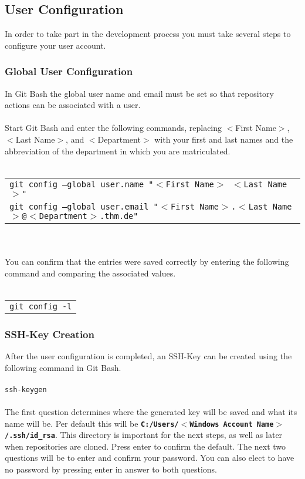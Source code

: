 \subsection{User Configuration}

In order to take part in the development process you must take several steps to configure your user account.

\subsubsection{Global User Configuration}
In Git Bash the global user name and email must be set so that repository actions can be associated with a user.\\
\\
Start Git Bash and enter the following commands, replacing $<$First Name$>$, $<$Last Name$>$, and $<$Department$>$ with your first and last names and the abbreviation of the department in which you are matriculated.\\
\\
\begin{tabular}{l}
	\texttt{git config --global user.name "$<$First Name$>$ $<$Last Name$>$"}\\
	\texttt{git config --global user.email "$<$First Name$>$.$<$Last Name$>$@$<$Department$>$.thm.de"}\\
\end{tabular}\\
\\
You can confirm that the entries were saved correctly by entering the following command and comparing the associated values.\\
\\
\begin{tabular}{l}
	\texttt{git config -l}
\end{tabular}

\subsubsection{SSH-Key Creation}

After the user configuration is completed, an SSH-Key can be created using the following command in Git Bash.\\
\\ 
\texttt{ssh-keygen}\\
\\
The first question determines where the generated key will be saved and what its name will be. Per default this will be \textbf{\texttt{C:/Users/$<$Windows Account Name$>$/.ssh/id\_rsa}}. This directory is important for the next steps, as well as later when repositories are cloned. Press enter to confirm the default.
The next two questions will be to enter and confirm your password. You can also elect to have no password by pressing enter in answer to both questions.

